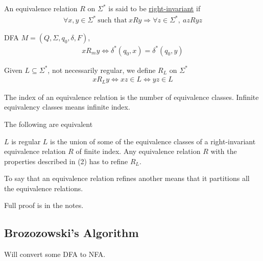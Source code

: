 \documentclass[class=scrartcl, crop=false]{standalone}
\begin{document}
\begin{definition}
  An equivalence relation $R$ on $\Sigma^*$ is said to be \ul{right-invariant} if 
  \begin{gather*}
    \forall x, y \in \Sigma^* \ \text{such that} \ xRy \Rightarrow \forall z \in \Sigma^*, \ azRyz
  \end{gather*} 
  \begin{example}
    DFA $M = (Q, \Sigma, q_0, \delta, F)$,
    \begin{gather*}
      xR_m y \Leftrightarrow \delta^*(q_0, x) = \delta^*(q_0, y)
    \end{gather*} 
  \end{example} 
  \begin{example}
    Given $L \subseteq \Sigma^*$, not necessarily regular, we define $R_L$ on $\Sigma^*$
    \begin{gather*}
      xR_Ly \Leftrightarrow xz \in L \Leftrightarrow yz \in L
    \end{gather*} 
  \end{example} 
\end{definition} 

\begin{note}
  The index of an equivalence relation is the number of equivalence classes. Infinite equivalency classes means infinite index.
\end{note} 

\begin{theorem}
  The following are equivalent
  \begin{enumerate}
    \ii
    $L$ is regular
    \ii
    $L$ is the union of some of the equivalence classes of a right-invariant equivalence relation $R$ of finite index.
    \ii
    Any equivalence relation $R$ with the properties described in (2) has to refine $R_L$.
  \end{enumerate} 
  \begin{note}
    To say that an equivalence relation refines another means that it partitions all the equivalence relations.
  \end{note} 
  Full proof is in the notes.
\end{theorem} 

\subsection{Brozozowski's Algorithm}

Will convert some DFA to NFA. 
\end{document}
